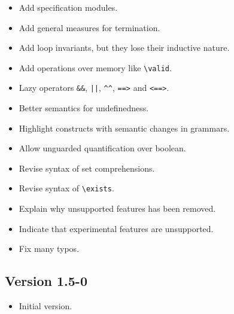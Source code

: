 \begin{itemize}
\item Add specification modules.
\item Add general measures for termination.
\item Add loop invariants, but they lose their inductive \acsl nature.
\item Add operations over memory like \lstinline|\valid|.
\item Lazy operators \lstinline|&&|, \lstinline+||+, \lstinline|^^|,
  \lstinline|==>| and \lstinline|<==>|.
\item Better semantics for undefinedness.
\item Highlight constructs with semantic changes in grammars.
\item Allow unguarded quantification over boolean.
\item Revise syntax of set comprehensions.
\item Revise syntax of \lstinline|\exists|.
\item Explain why unsupported features has been removed.
\item Indicate that experimental \acsl features are unsupported.
\item Fix many typos.
\end{itemize}

\subsection{Version 1.5-0}

\begin{itemize}
\item Initial version.
\end{itemize}
